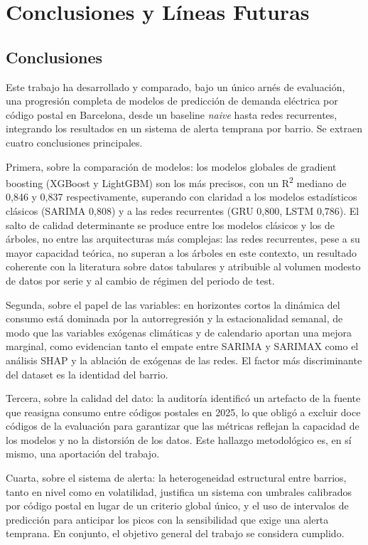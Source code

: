 \documentclass[12pt, a4paper]{article}
\begin{document}
\section{Conclusiones y Líneas Futuras}

\subsection{Conclusiones}

Este trabajo ha desarrollado y comparado, bajo un único arnés de evaluación, una progresión completa de modelos de predicción de demanda eléctrica por código postal en Barcelona, desde un baseline \textit{naive} hasta redes recurrentes, integrando los resultados en un sistema de alerta temprana por barrio. Se extraen cuatro conclusiones principales.

Primera, sobre la comparación de modelos: los modelos globales de gradient boosting (XGBoost y LightGBM) son los más precisos, con un R\textsuperscript{2} mediano de 0,846 y 0,837 respectivamente, superando con claridad a los modelos estadísticos clásicos (SARIMA 0,808) y a las redes recurrentes (GRU 0,800, LSTM 0,786). El salto de calidad determinante se produce entre los modelos clásicos y los de árboles, no entre las arquitecturas más complejas: las redes recurrentes, pese a su mayor capacidad teórica, no superan a los árboles en este contexto, un resultado coherente con la literatura sobre datos tabulares y atribuible al volumen modesto de datos por serie y al cambio de régimen del periodo de test.

Segunda, sobre el papel de las variables: en horizontes cortos la dinámica del consumo está dominada por la autorregresión y la estacionalidad semanal, de modo que las variables exógenas climáticas y de calendario aportan una mejora marginal, como evidencian tanto el empate entre SARIMA y SARIMAX como el análisis SHAP y la ablación de exógenas de las redes. El factor más discriminante del dataset es la identidad del barrio.

Tercera, sobre la calidad del dato: la auditoría identificó un artefacto de la fuente que reasigna consumo entre códigos postales en 2025, lo que obligó a excluir doce códigos de la evaluación para garantizar que las métricas reflejan la capacidad de los modelos y no la distorsión de los datos. Este hallazgo metodológico es, en sí mismo, una aportación del trabajo.

Cuarta, sobre el sistema de alerta: la heterogeneidad estructural entre barrios, tanto en nivel como en volatilidad, justifica un sistema con umbrales calibrados por código postal en lugar de un criterio global único, y el uso de intervalos de predicción para anticipar los picos con la sensibilidad que exige una alerta temprana. En conjunto, el objetivo general del trabajo se considera cumplido.
\end{document}
